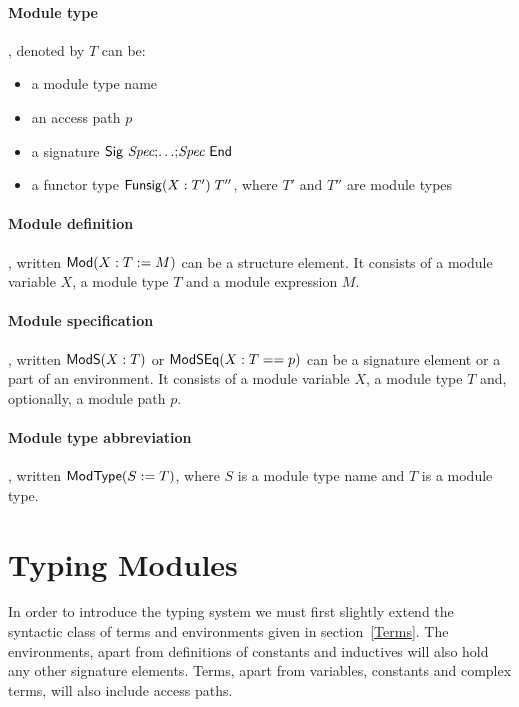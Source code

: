 \paragraph{Module type}, denoted by $T$ can be:
\begin{itemize}
\item a module type name
\item an access path $p$
\item a signature ${\sf Sig}~{\textit{Spec}} {\tt ;} {\ldots} {\tt ;} {\textit{Spec}}~{\sf End}$
\item a functor type ${\sf Funsig}(X:T')\;T''$, where $T'$ and $T''$ are
  module types
\end{itemize}

\paragraph{Module definition}, written ${\sf Mod}({X}:{T}:={M})$ can be a
structure element. It consists of a module variable $X$, a module type
$T$ and a module expression $M$.

\paragraph{Module specification}, written ${\sf ModS}({X}:{T})$ or
${\sf ModSEq}({X}:{T}=={p})$ can be a signature element or a part of an
environment. It consists of a module variable $X$, a module type $T$
and, optionally, a module path $p$. 

\paragraph{Module type abbreviation}, written ${\sf ModType}({S}:={T})$, where
$S$ is a module type name and $T$ is a module type.


\section{Typing Modules}

In order to introduce the typing system we must first slightly extend
the syntactic class of terms and environments given in
section~\ref{Terms}. The environments, apart from definitions of
constants and inductives will also hold any other signature elements.
Terms, apart from variables, constants and complex terms, will also
include access paths.

